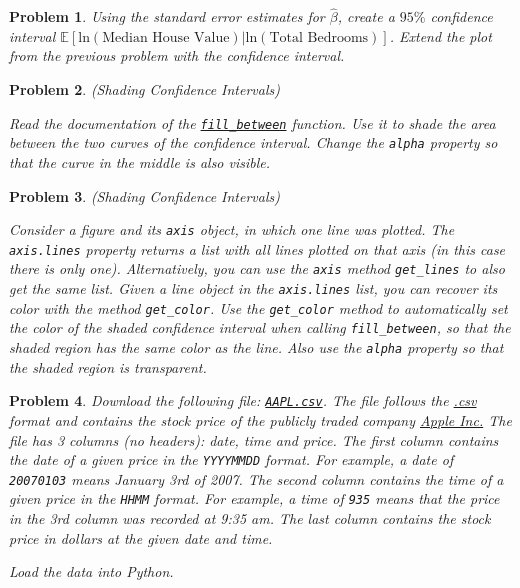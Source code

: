 \documentclass[12pt, a4paper]{article}
\newcommand{\E}[1]{\mathbb{E}{\left[#1\right]}}
\renewcommand{\ln}[1]{\text{ln}\left(#1\right)}
\newtheorem{problem}{Problem}
\begin{document}
\begin{problem}
Using the standard error estimates for \(\hat{\beta}\), create a \(95\%\) confidence interval \(\E{\ln{\text{Median House Value}}\vert\ln{\text{Total Bedrooms}}}\).
Extend the plot from the previous problem with the confidence interval.
\end{problem}

\begin{problem}
(Shading Confidence Intervals)

Read the documentation of the \href{https://matplotlib.org/api/\_as\_gen/matplotlib.axes.Axes.fill\_between.html\#matplotlib.axes.Axes.fill\_between}{\texttt{fill\_between}} function.
Use it to shade the area between the two curves of the confidence interval.
Change the \texttt{alpha} property so that the curve in the middle is also visible.
\end{problem}

\begin{problem}
(Shading Confidence Intervals)

Consider a figure and its \texttt{axis} object, in which one line was plotted.
The \texttt{axis.lines} property returns a list with all lines plotted on that axis (in this case there is only one).
Alternatively, you can use the \texttt{axis} method \texttt{get\_lines} to also get the same list.
Given a line object in the \texttt{axis.lines} list, you can recover its color with the method \texttt{get\_color}.
Use the \texttt{get\_color} method to automatically set the color of the shaded confidence interval when calling \texttt{fill\_between}, so that the shaded region has the same color as the line. Also use the \texttt{alpha} property so that the shaded region is transparent.
\end{problem}

\begin{problem}
Download the following file: \href{https://github.com/matlab-for-economists/data}{\texttt{AAPL.csv}}.
The file follows the \href{https://en.wikipedia.org/wiki/Comma-separated\_values}{.csv} format and contains the stock price of the publicly traded company \href{https://en.wikipedia.org/wiki/Apple\_Inc.}{Apple Inc.}
The file has 3 columns (no headers): date, time and price.
The first column contains the date of a given price in the \texttt{YYYYMMDD} format.
For example, a date of \texttt{20070103} means January 3rd of 2007.
The second column contains the time of a given price in the \texttt{HHMM} format.
For example, a time of \texttt{935} means that the price in the 3rd column was recorded at 9:35 am.
The last column contains the stock price in dollars at the given date and time.

Load the data into Python.
\end{problem}
\end{document}
